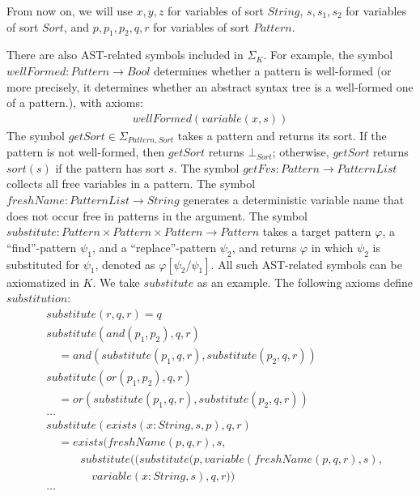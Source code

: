 \documentclass[UTF8]{article}
\theoremstyle{plain}
\theoremstyle{definition}
\theoremstyle{remark}
\newcommand{\cln}{{:}}
\begin{document}
From now on, we will use $x, y, z$ for variables of sort $\mathit{String}$, $s, s_1, s_2$ for variables of sort $\mathit{Sort}$, and $p, p_1, p_2, q, r$ for variables of sort $\mathit{Pattern}$. 

There are also AST-related symbols included in $\Sigma_K$.
For example, the symbol $\mathit{wellFormed} \colon \mathit{Pattern} \to \mathit{Bool}$ determines whether a pattern is well-formed (or more precisely, it determines whether an abstract syntax tree is a well-formed one of a pattern.), with axioms:
\begin{align*}
\mathit{wellFormed}(\mathit{variable}(x, s))
\end{align*}
The symbol $\mathit{getSort} \in \Sigma_{\mathit{Pattern}, \mathit{Sort}}$ takes a pattern and returns its sort. 
If the pattern is not well-formed, then $\mathit{getSort}$ returns $\bot_\mathit{Sort}$; 
otherwise, $\mathit{getSort}$ returns $\mathit{sort}(s)$ if the pattern has sort $s$.
The symbol $\mathit{getFvs} \colon \mathit{Pattern} \to \mathit{PatternList}$ collects all free variables in a pattern.
The symbol $\mathit{freshName} \colon \mathit{PatternList} \to \mathit{String}$ generates a deterministic variable name that does not occur free in patterns in the argument.
The symbol $\mathit{substitute} \colon \mathit{Pattern} \times \mathit{Pattern} \times \mathit{Pattern} \to \mathit{Pattern}$ takes a target pattern $\varphi$, a ``find''-pattern $\psi_1$, and a ``replace''-pattern $\psi_2$, and returns $\varphi$ in which $\psi_2$ is substituted for $\psi_1$, denoted as $\varphi[\psi_2 / \psi_1]$.
All such AST-related symbols can be axiomatized in $K$. 
We take $\mathit{substitute}$ as an example. 
The following axioms define $\mathit{substitution}$:
\begin{align*}
&\mathit{substitute}(r, q, r) = q\\
&\mathit{substitute}(\mathit{and}(p_1, p_2), q, r) \\ 
&\quad = \mathit{and}(\mathit{substitute}(p_1, q, r), \mathit{substitute}(p_2, q, r))\\
&\mathit{substitute}(\mathit{or}(p_1, p_2), q, r) \\
&\quad = \mathit{or}(\mathit{substitute}(p_1, q, r), \mathit{substitute}(p_2, q, r))\\
&\dots\\
&\mathit{substitute}(\mathit{exists}(x\cln\mathit{String}, s, p), q, r)\\
&\quad = \mathit{exists}(\mathit{freshName}(p, q, r), s,\\
&\qquad \quad \mathit{substitute}((\mathit{substitute}(p, variable(\mathit{freshName}(p, q, r), s), \\
&\qquad \quad \quad variable(x\cln\mathit{String}, s), q, r))\\
&\dots
\end{align*}
\end{document}

